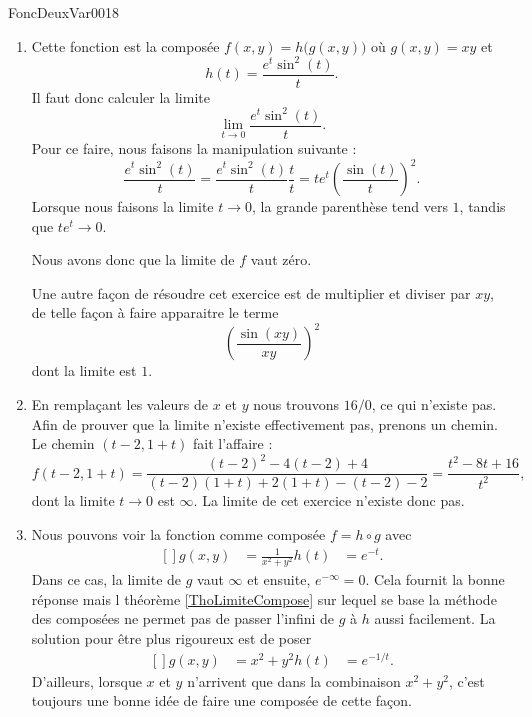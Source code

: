 \begin{corrige}{FoncDeuxVar0018}
\begin{enumerate}
		\item	%
			Cette fonction est la composée $f(x,y)=h\big( g(x,y) \big)$ où $g(x,y)=xy$ et
			\begin{equation}
				h(t)=\frac{  e^{t}\sin^2(t) }{ t }.
			\end{equation}
			Il faut donc calculer la limite
			\begin{equation}
				\lim_{t\to 0}\frac{  e^{t}\sin^2(t) }{ t }.
			\end{equation}
			Pour ce faire, nous faisons la manipulation suivante :
			\begin{equation}
				\frac{  e^{t}\sin^2(t) }{ t }=\frac{  e^{t}\sin^2(t) }{ t }\frac{ t }{ t }=t e^{t}\left( \frac{ \sin(t) }{ t } \right)^2.
			\end{equation}
			Lorsque nous faisons la limite $t\to 0$, la grande parenthèse tend vers $1$, tandis que $t e^{t}\to 0$.

			Nous avons donc que la limite de $f$ vaut zéro.

			Une autre façon de résoudre cet exercice est de multiplier et diviser par $xy$, de telle façon à faire apparaitre le terme
			\begin{equation}
				\left( \frac{ \sin(xy) }{ xy } \right)^2
			\end{equation}
			dont la limite est $1$.
		\item	%
			En remplaçant les valeurs de $x$ et $y$ nous trouvons $16/0$, ce qui n'existe pas. Afin de prouver que la limite n'existe effectivement pas, prenons un chemin. Le chemin $(t-2,1+t)$ fait l'affaire :
			\begin{equation}
				f(t-2,1+t)=\frac{ (t-2)^2-4(t-2)+4 }{ (t-2)(1+t)+2(1+t)-(t-2)-2 }=\frac{ t^2-8t+16 }{ t^2 },
			\end{equation}
			dont la limite $t\to 0$ est $\infty$. La limite de cet exercice n'existe donc pas.
		\item	%
			Nous pouvons voir la fonction comme composée $f=h\circ g$ avec
			\begin{equation}
				\begin{aligned}[]
					g(x,y)&=\frac{1}{ x^2+y^2 }
					h(t)&= e^{-t}.
				\end{aligned}
			\end{equation}
			Dans ce cas, la limite de $g$ vaut $\infty$ et ensuite, $ e^{-\infty}=0$. Cela fournit la bonne réponse mais l théorème \ref{ThoLimiteCompose} sur lequel se base la méthode des composées ne permet pas de passer l'infini de $g$ à $h$ aussi facilement. La solution pour être plus rigoureux est de poser
			\begin{equation}
				\begin{aligned}[]
					g(x,y)&=x^2+y^2
					h(t)&= e^{-1/t}.
				\end{aligned}
			\end{equation}
			D'ailleurs, lorsque $x$ et $y$ n'arrivent que dans la combinaison $x^2+y^2$, c'est toujours une bonne idée de faire une composée de cette façon.


\end{enumerate}
\end{corrige}
